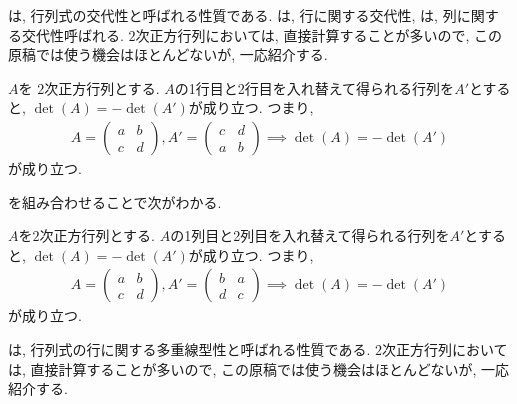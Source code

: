 は,
行列式の交代性と呼ばれる性質である.
は,
行に関する交代性,
は,
列に関する交代性呼ばれる.
$2$次正方行列においては,
直接計算することが多いので,
この原稿では使う機会はほとんどないが,
一応紹介する.
\begin{theorem}
  \label{thm:det:alt:row}
  $A$を
  $2$次正方行列とする.
  $A$の1行目と2行目を入れ替えて得られる行列を$A'$とすると,
  $\det(A)=-\det(A')$が成り立つ.
  つまり,
  \begin{align*}
    A=\begin{pmatrix}a&b\\c&d\end{pmatrix},
    A'=\begin{pmatrix}c&d\\a&b\end{pmatrix}
    \implies \det(A)=-\det(A')
  \end{align*}
  が成り立つ.
\end{theorem}
を組み合わせることで次がわかる.
\begin{theorem}
  \label{thm:det:alt:col}
  $A$を$2$次正方行列とする.
  $A$の1列目と2列目を入れ替えて得られる行列を$A'$とすると,
  $\det(A)=-\det(A')$が成り立つ.
  つまり,
  \begin{align*}
    A=\begin{pmatrix}a&b\\c&d\end{pmatrix},
    A'=\begin{pmatrix}b&a\\d&c\end{pmatrix}
    \implies
    \det(A)=-\det(A')
  \end{align*}
が成り立つ.
\end{theorem}
は,
行列式の行に関する多重線型性と呼ばれる性質である.
$2$次正方行列においては,
直接計算することが多いので,
この原稿では使う機会はほとんどないが,
一応紹介する.
